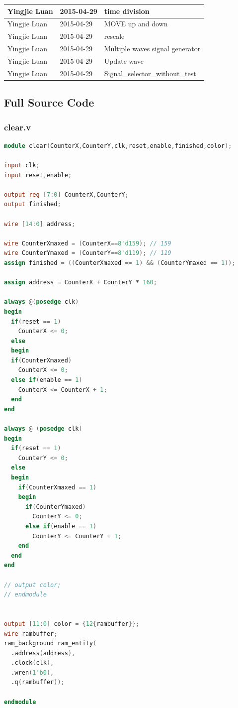 \documentclass[11pt]{scrartcl}
\begin{document}
\begin{longtable}{@{\extracolsep{\fill}}lll@{}}
Yingjie Luan & 2015-04-29 & time division \\ \hline
Yingjie Luan & 2015-04-29 & MOVE up and down \\ \hline
Yingjie Luan & 2015-04-29 & rescale \\ \hline
Yingjie Luan & 2015-04-29 & Multiple waves signal generator \\ \hline
Yingjie Luan & 2015-04-29 & Update wave \\ \hline
Yingjie Luan & 2015-04-29 & Signal\_selector\_without\_test \\ \hline\end{longtable}

\subsection{Full Source Code}
\subsubsection{clear.v}
\label{sec:clearv}
\begin{lstlisting}[language=Verilog]
module clear(CounterX,CounterY,clk,reset,enable,finished,color);

input clk;
input reset,enable;

output reg [7:0] CounterX,CounterY;
output finished;

wire [14:0] address;

wire CounterXmaxed = (CounterX==8'd159); // 159
wire CounterYmaxed = (CounterY==8'd119); // 119
assign finished = ((CounterXmaxed == 1) && (CounterYmaxed == 1));

assign address = CounterX + CounterY * 160;

always @(posedge clk)
begin
  if(reset == 1)
    CounterX <= 0;
  else
  begin
  if(CounterXmaxed)
    CounterX <= 0;
  else if(enable == 1)
    CounterX <= CounterX + 1;
  end
end

always @ (posedge clk)
begin
  if(reset == 1)
    CounterY <= 0;
  else
  begin
    if(CounterXmaxed == 1)
    begin
      if(CounterYmaxed)
        CounterY <= 0;
      else if(enable == 1)
        CounterY <= CounterY + 1;
    end
  end
end

// output color;
// endmodule


output [11:0] color = {12{rambuffer}};
wire rambuffer;
ram_background ram_entity(
  .address(address),
  .clock(clk),
  .wren(1'b0),
  .q(rambuffer));

endmodule
\end{lstlisting}
\end{document}
